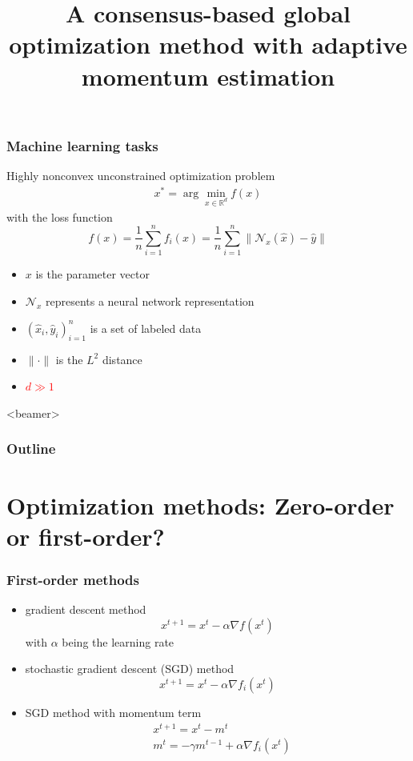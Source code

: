 \documentclass[aspectratio=169]{beamer}
\begin{document}
	

\title[Adam-CBO]{A consensus-based global optimization method with adaptive momentum estimation}
\maketitleframe
\begin{frame}
\frametitle{Machine learning tasks}

Highly nonconvex unconstrained optimization problem
\begin{align*}
x^* = \arg\min_{x\in \mathbb{R}^d} f(x)
\end{align*}
with the loss function
\begin{equation*}
f(x) = \frac{1}{n}\sum_{i=1}^n f_i(x) = \frac{1}{n}\sum_{i=1}^n\|\mathcal{N}_x(\hat{x})-\hat{y}\|
\end{equation*}
\begin{itemize}
	\item[] $x$ is the parameter vector
	\item[] $\mathcal{N}_x$ represents a neural network representation
	\item[] $(\hat{x}_i,\hat{y}_i)_{i=1}^n$ is a set of labeled data
	\item[] $\|\cdot\|$ is the $L^2$ distance
	\item[] \textcolor{red}{$d\gg 1$}
\end{itemize}

\end{frame}

\begin{frame}<beamer>
\frametitle{\textbf{Outline}}
\tableofcontents[]
\end{frame}

\section{Optimization methods: Zero-order or first-order?}

\begin{frame}
\frametitle{First-order methods}

\begin{itemize}
	\item gradient descent method
	\begin{equation*}
	x^{t+1} = x^t - \alpha \nabla f(x^t)
	\end{equation*}	
	with $\alpha$ being the learning rate
	\item stochastic gradient descent (SGD) method
	\begin{equation*}
		x^{t+1} = x^t - \alpha \nabla f_i(x^t)
	\end{equation*}	
	\item SGD method with momentum term 
	\begin{align*}
		&x^{t+1} = x^t - m^t\\
		&m^t = -\gamma m^{t-1} + \alpha \nabla f_i(x^t)
	\end{align*}
\end{itemize}

\end{frame}
\end{document}

